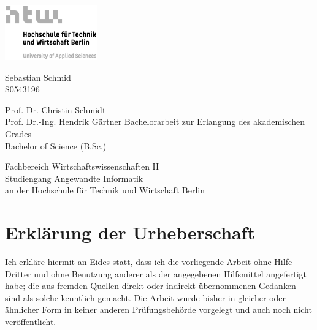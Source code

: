 

\begin{titlepage}
    \begin{addmargin}[4cm]{-1cm}
        \centering
        \hfill\includegraphics[width=4cm]{pix/S07_HTW_Berlin_Logo_pos_GRAU_RGB.jpg}\par
        \vspace{4\baselineskip}
        {\Huge 
        \par}
        \vspace{4\baselineskip}
    
        \par
        {\Large Sebastian Schmid \\ S0543196 \par}
        \vfill
        {Prof. Dr. Christin Schmidt \\ Prof. Dr.-Ing. Hendrik Gärtner} 
        \vfill
        Bachelorarbeit zur Erlangung des akademischen Grades\\ Bachelor of Science (B.Sc.)\par
        {Fachbereich Wirtschaftswissenschaften II \\ Studiengang Angewandte Informatik \\ an der Hochschule für Technik und Wirtschaft Berlin}
    \end{addmargin}
\end{titlepage}

\newpage

\section*{Erklärung der Urheberschaft}\thispagestyle{empty}

Ich erkläre hiermit an Eides statt, dass ich die vorliegende Arbeit
ohne Hilfe Dritter und ohne Benutzung anderer als der angegebenen
Hilfsmittel angefertigt habe; die aus fremden Quellen direkt oder
indirekt übernommenen Gedanken sind als solche kenntlich gemacht. Die
Arbeit wurde bisher in gleicher oder ähnlicher Form in keiner anderen
Prüfungsbehörde vorgelegt und auch noch nicht veröffentlicht.


